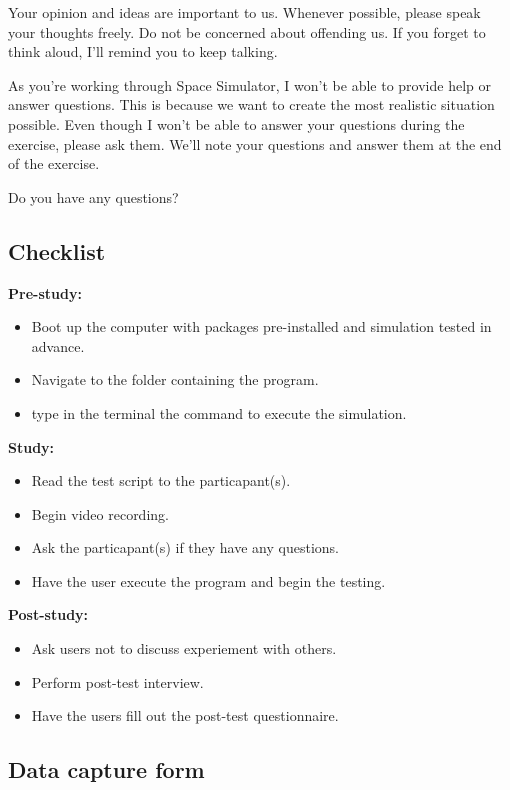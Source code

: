 Your opinion and ideas are important to us.  Whenever possible, please speak your thoughts freely.  Do not be concerned about offending us.  If you forget to think aloud, I'll remind you to keep talking. 
    
As you’re working through Space Simulator, I won’t be able to provide help or answer questions.  This is because we want to create the most realistic situation possible.  Even though I won't be able to answer your questions during the exercise, please ask them. We'll note your questions and answer them at the end of the exercise. 
     
Do you have any questions? 

\subsection{Checklist}

\noindent
\textbf{Pre-study:}
\begin{itemize}
  \item Boot up the computer with packages pre-installed and simulation tested in advance.
  \item Navigate to the folder containing the program.
  \item type in the terminal the command to execute the simulation.
\end{itemize}

\noindent
\textbf{Study:}
\begin{itemize}
  \item Read the test script to the particapant(s).
  \item Begin video recording.
  \item Ask the particapant(s) if they have any questions.
  \item Have the user execute the program and begin the testing.
\end{itemize}

\noindent
\textbf{Post-study:}
\begin{itemize}
  \item Ask users not to discuss experiement with others.
  \item Perform post-test interview.
  \item Have the users fill out the post-test questionnaire.
\end{itemize}

\subsection{Data capture form}

